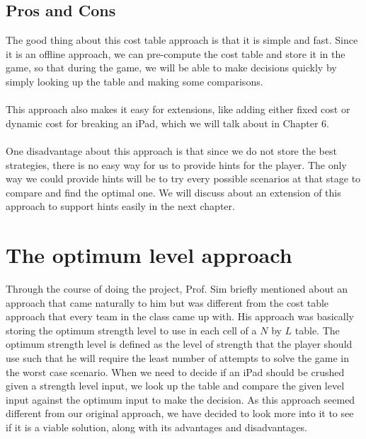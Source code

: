 \documentclass[12pt,a4paper,oneside]{report}
\begin{document}
\section{Pros and Cons}
The good thing about this cost table approach is that it is simple and fast. Since it is an offline approach, we can pre-compute the cost table and store it in the game, so that during the game, we will be able to make decisions quickly by simply looking up the table and making some comparisons. \\\\
This approach also makes it easy for extensions, like adding either fixed cost or dynamic cost for breaking an iPad, which we will talk about in Chapter 6. \\\\
One disadvantage about this approach is that since we do not store the best strategies, there is no easy way for us to provide hints for the player. The only way we could provide hints will be to try every possible scenarios at that stage to compare and find the optimal one. We will discuss about an extension of this approach to support hints easily in the next chapter.


\chapter{The optimum level approach}
Through the course of doing the project, Prof. Sim briefly mentioned about an approach that came naturally to him but was different from the cost table approach that every team in the class came up with. His approach was basically storing the optimum strength level to use in each cell of a $N$ by $L$ table. The optimum strength level is defined as the level of strength that the player should use such that he will require the least number of attempts to solve the game in the worst case scenario. When we need to decide if an iPad should be crushed given a strength level input, we look up the table and compare the given level input against the optimum input to make the decision. As this approach seemed different from our original approach, we have decided to look more into it to see if it is a viable solution, along with its advantages and disadvantages.
\end{document}
